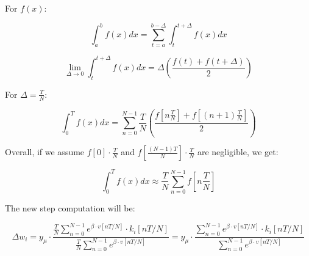 \begin{mdframed}[linewidth=2pt, frametitlerule=true, frametitlebackgroundcolor=gray!20, innertopmargin=10pt, innerbottommargin=10pt]
    \begin{theorem}
        For $f(x)$:
        
        \begin{equation*}
            \int_a^b f(x) dx = \sum_{t=a}^{b-\Delta} \int_t^{t+\Delta} f(x) dx
        \end{equation*}

        \begin{equation*}
            \lim_{{\Delta\to0}} \int_t^{t+\Delta} f(x) dx = \Delta \left(\frac{f(t)+f(t+\Delta)}{2}\right)
        \end{equation*}

        For $\Delta = \frac{T}{N}$:

        \begin{equation*}
            \int_0^T f(x) dx = \sum_{n=0}^{N-1} \frac{T}{N}\left(\frac{f[n\frac{T}{N}]+f[(n+1)\frac{T}{N}]}{2}\right)
        \end{equation*}

        Overall, if we assume $f[0] \cdot \frac{T}{N}$ and $f\left[\frac{(N-1)T}{N}\right] \cdot \frac{T}{N}$ are negligible, we get:

        \begin{equation*}
            \int_0^T f(x) dx \approx \frac{T}{N}\sum_{n=0}^{N-1} f[n\frac{T}{N}]
        \end{equation*}
    \end{theorem}
\end{mdframed}

The new step computation will be:

\begin{equation}
    \Delta w_i = y_{\mu} \cdot \frac{\frac{T}{N}\sum_{n=0}^{N-1} e^{\beta \cdot v[nT/N]} \cdot k_i[nT/N]}{\frac{T}{N}\sum_{n=0}^{N-1} e^{\beta \cdot v[nT/N]}} = y_{\mu} \cdot \frac{\sum_{n=0}^{N-1} e^{\beta \cdot v[nT/N]} \cdot k_i[nT/N]}{\sum_{n=0}^{N-1} e^{\beta \cdot v[nT/N]}}
\end{equation}

